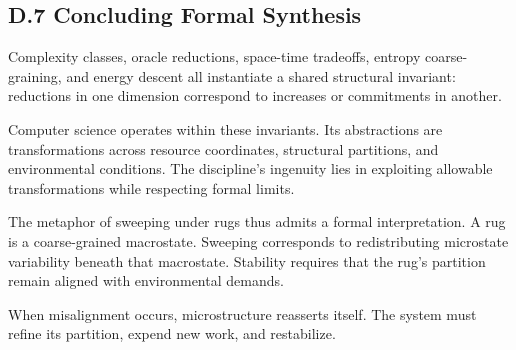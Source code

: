 \documentclass[11pt]{article}
\begin{document}
\subsection{D.7 Concluding Formal Synthesis}

Complexity classes, oracle reductions, space-time tradeoffs, entropy coarse-graining, and energy descent all instantiate a shared structural invariant: reductions in one dimension correspond to increases or commitments in another.

Computer science operates within these invariants. Its abstractions are transformations across resource coordinates, structural partitions, and environmental conditions. The discipline's ingenuity lies in exploiting allowable transformations while respecting formal limits.

The metaphor of sweeping under rugs thus admits a formal interpretation. A rug is a coarse-grained macrostate. Sweeping corresponds to redistributing microstate variability beneath that macrostate. Stability requires that the rug's partition remain aligned with environmental demands.

When misalignment occurs, microstructure reasserts itself. The system must refine its partition, expend new work, and restabilize.
\end{document}
